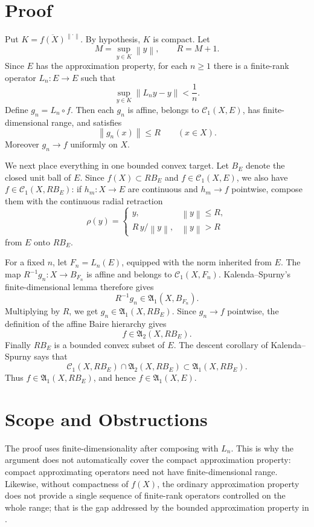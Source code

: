 \documentclass[11pt]{amsart}
\newcommand{\A}{\mathfrak{A}}
\newcommand{\C}{\mathcal{C}}
\newcommand{\norm}[1]{\left\lVert #1\right\rVert}
\begin{document}
\section{Proof}

Put \(K=\overline{f(X)}^{\norm{\cdot}}\).  By hypothesis, \(K\) is compact.
Let
\[
        M=\sup_{y\in K}\norm{y}, \qquad R=M+1.
\]
Since \(E\) has the approximation property, for each \(n\ge 1\) there is a
finite-rank operator \(L_n:E\to E\) such that
\[
        \sup_{y\in K}\norm{L_n y-y}<\frac1n .
\]
Define \(g_n=L_n\circ f\).  Then each \(g_n\) is affine, belongs to
\(\C_1(X,E)\), has finite-dimensional range, and satisfies
\[
        \norm{g_n(x)}\le R \qquad (x\in X).
\]
Moreover \(g_n\to f\) uniformly on \(X\).

We next place everything in one bounded convex target.  Let \(B_E\) denote the
closed unit ball of \(E\).  Since \(f(X)\subset R B_E\) and \(f\in\C_1(X,E)\),
we also have \(f\in\C_1(X,RB_E)\): if \(h_m:X\to E\) are continuous and
\(h_m\to f\) pointwise, compose them with the continuous radial retraction
\[
        \rho(y)=
        \begin{cases}
        y, & \norm{y}\le R,\\
        R\,y/\norm{y}, & \norm{y}>R
        \end{cases}
\]
from \(E\) onto \(R B_E\).

For a fixed \(n\), let \(F_n=L_n(E)\), equipped with the norm inherited from
\(E\).  The map \(R^{-1}g_n:X\to B_{F_n}\) is affine and belongs to
\(\C_1(X,F_n)\).  Kalenda--Spurny's finite-dimensional lemma
\cite[Lemma 4.6]{KS} therefore gives
\[
        R^{-1}g_n\in \A_1(X,B_{F_n}).
\]
Multiplying by \(R\), we get \(g_n\in\A_1(X,RB_E)\).  Since \(g_n\to f\)
pointwise, the definition of the affine Baire hierarchy gives
\[
        f\in \A_2(X,RB_E).
\]
Finally \(R B_E\) is a bounded convex subset of \(E\).  The descent corollary
of Kalenda--Spurny \cite[Corollary 3.8]{KS} says that
\[
        \C_1(X,RB_E)\cap \A_2(X,RB_E)\subset \A_1(X,RB_E).
\]
Thus \(f\in\A_1(X,RB_E)\), and hence \(f\in\A_1(X,E)\).

\section{Scope and Obstructions}

The proof uses finite-dimensionality after composing with \(L_n\).  This is why
the argument does not automatically cover the compact approximation property:
compact approximating operators need not have finite-dimensional range.
Likewise, without compactness of \(f(X)\), the ordinary approximation property
does not provide a single sequence of finite-rank operators controlled on the
whole range; that is the gap addressed by the bounded approximation property in
\cite[Theorem 2.2]{KS}.
\end{document}
